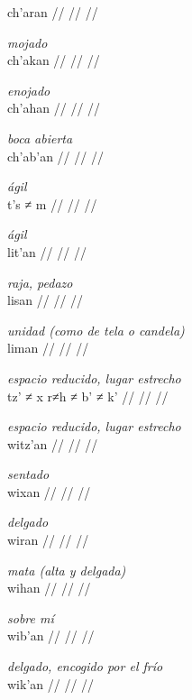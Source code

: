 \documentclass{article}%
\begin{document}
\begingl
\gla ch'aran //
\glb  //
\glc  //
\endgl
\xe
%
\medskip%
\par\medskip%
\ex
\textit{mojado} \\
\begingl
\gla ch'akan //
\glb  //
\glc  //
\endgl
\xe
%
\medskip%
\par\medskip%
\ex
\textit{enojado} \\
\begingl
\gla ch'ahan //
\glb  //
\glc  //
\endgl
\xe
%
\medskip%
\par\medskip%
\ex
\textit{boca abierta} \\
\begingl
\gla ch'ab'an //
\glb  //
\glc  //
\endgl
\xe
%
\medskip%
\par\medskip%
\ex
\textit{ágil} \\
\begingl
\gla t's ≠ m //
\glb  //
\glc  //
\endgl
\xe
%
\medskip%
\par\medskip%
\ex
\textit{ágil} \\
\begingl
\gla lit'an //
\glb  //
\glc  //
\endgl
\xe
%
\medskip%
\par\medskip%
\ex
\textit{raja, pedazo} \\
\begingl
\gla lisan //
\glb  //
\glc  //
\endgl
\xe
%
\medskip%
\par\medskip%
\ex
\textit{unidad (como de tela o candela)} \\
\begingl
\gla liman //
\glb  //
\glc  //
\endgl
\xe
%
\medskip%
\par\medskip%
\ex
\textit{espacio reducido, lugar estrecho} \\
\begingl
\gla tz' ≠ x r≠h ≠ b' ≠ k' //
\glb  //
\glc  //
\endgl
\xe
%
\medskip%
\par\medskip%
\ex
\textit{espacio reducido, lugar estrecho} \\
\begingl
\gla witz'an //
\glb  //
\glc  //
\endgl
\xe
%
\medskip%
\par\medskip%
\ex
\textit{sentado} \\
\begingl
\gla wixan //
\glb  //
\glc  //
\endgl
\xe
%
\medskip%
\par\medskip%
\ex
\textit{delgado} \\
\begingl
\gla wiran //
\glb  //
\glc  //
\endgl
\xe
%
\medskip%
\par\medskip%
\ex
\textit{mata (alta y delgada)} \\
\begingl
\gla wihan //
\glb  //
\glc  //
\endgl
\xe
%
\medskip%
\par\medskip%
\ex
\textit{sobre mí} \\
\begingl
\gla wib'an //
\glb  //
\glc  //
\endgl
\xe
%
\medskip%
\par\medskip%
\ex
\textit{delgado, encogido por el frío} \\
\begingl
\gla wik'an //
\glb  //
\glc  //
\endgl
\xe
%
\medskip

%
\end{document}
